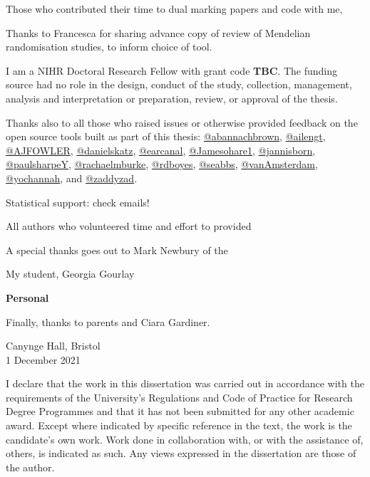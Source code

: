 \documentclass[a4paper, twoside]{templates/ociamthesis}
\begin{document}
\begin{romanpages}
\begin{acknowledgements}
  Those who contributed their time to dual marking papers and code with me,

  Thanks to Francesca for sharing advance copy of review of Mendelian randomisation studies, to inform choice of tool.

  I am a NIHR Doctoral Research Fellow with grant code \textbf{TBC}. The funding source had no role in the design, conduct of the study, collection, management, analysis and interpretation or preparation, review, or approval of the thesis.

  Thanks also to all those who raised issues or otherwise provided feedback on the open source tools built as part of this thesis:
  \href{https://github.com/abannachbrown}{@abannachbrown}, \href{https://github.com/ailengt}{@ailengt}, \href{https://github.com/AJFOWLER}{@AJFOWLER}, \href{https://github.com/danielskatz}{@danielskatz}, \href{https://github.com/earcanal}{@earcanal}, \href{https://github.com/Jamesohare1}{@Jamesohare1}, \href{https://github.com/jannisborn}{@jannisborn}, \href{https://github.com/paulsharpeY}{@paulsharpeY}, \href{https://github.com/rachaelmburke}{@rachaelmburke}, \href{https://github.com/rdboyes}{@rdboyes}, \href{https://github.com/seabbs}{@seabbs}, \href{https://github.com/vanAmsterdam}{@vanAmsterdam}, \href{https://github.com/yochannah}{@yochannah}, and \href{https://github.com/zaddyzad}{@zaddyzad}.

  Statistical support: check emails!

  All authors who volunteered time and effort to provided

  A special thanks goes out to Mark Newbury of the

  My student, Georgia Gourlay

  \textbf{Personal}

  Finally, thanks to parents and Ciara Gardiner.

  \begin{flushright}
  Canynge Hall, Bristol \\1 December 2021
  \end{flushright}
\end{acknowledgements}

\begin{declaration}
 	I declare that the work in this dissertation was carried out in accordance with the requirements of the University's Regulations and Code of Practice for Research Degree Programmes and that it has not been submitted for any other academic award. Except where indicated by specific reference in the text, the work is the candidate's own work. Work done in collaboration with, or with the assistance of, others, is indicated as such. Any views expressed in the dissertation are those of the author.


\end{declaration}
\end{romanpages}
\end{document}

